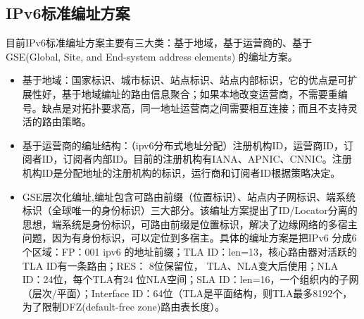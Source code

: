 \subsection{IPv6标准编址方案}
目前IPv6标准编址方案主要有三大类：基于地域\cite{deering1995metro}，基于运营商的\cite{rekhter1997ipv6}、基于GSE\cite{o1997gse}(Global, Site, and End-system address elements) 的编址方案。
\begin{itemize}
\item 基于地域：国家标识、城市标识、站点标识、站点内部标识，它的优点是可扩展性好，基于地域编址的路由信息聚合；如果本地改变运营商，不需要重编号。缺点是对拓扑要求高，同一地址运营商之间需要相互连接；而且不支持灵活的路由策略。
\item 基于运营商的编址结构：（ipv6分布式地址分配）注册机构ID，运营商ID，订阅者ID，订阅者内部ID。目前的注册机构有IANA、APNIC、CNNIC。注册机构ID是分配地址的注册机构的标识，运行商和订阅者ID根据策略决定。
\item GSE层次化编址,编址包含可路由前缀（位置标识）、站点内子网标识、端系统标识（全球唯一的身份标识）三大部分。该编址方案提出了ID/Locator分离的思想，端系统是身份标识，可路由前缀是位置标识，解决了边缘网络的多宿主问题，因为有身份标识，可以定位到多宿主。具体的编址方案是把IPv6 分成6个区域：FP：001 ipv6 的地址前缀；TLA ID：len=13，核心路由器对活跃的TLA ID有一条路由；RES： 8位保留位， TLA、NLA变大后使用；NLA ID：24位，每个TLA有24 位NLA空间；SLA ID：len=16，一个组织内的子网（层次/平面）；Interface ID：64位（TLA是平面结构，则TLA最多8192个，为了限制DFZ(default-free zone)路由表长度）。
\end{itemize}

